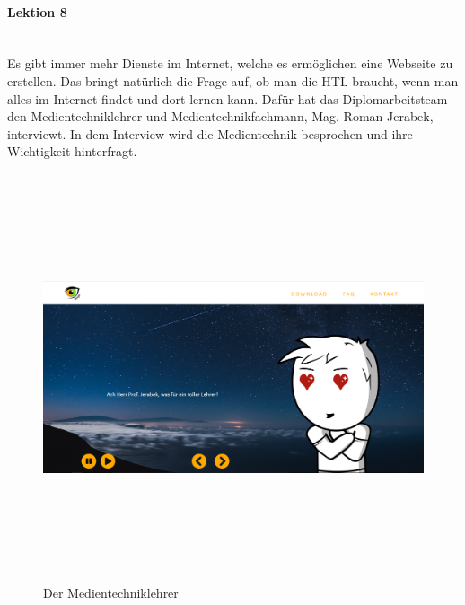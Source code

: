 \paragraph{Lektion 8} \leavevmode \\
Es gibt immer mehr Dienste im Internet, welche es ermöglichen eine Webseite zu erstellen. Das bringt natürlich die Frage auf, ob man die HTL braucht, wenn man alles im Internet findet und dort lernen kann. Dafür hat das Diplomarbeitsteam den Medientechniklehrer und Medientechnikfachmann, Mag. Roman Jerabek, interviewt. In dem Interview wird die Medientechnik besprochen und ihre Wichtigkeit hinterfragt.
\begin{figure}[h]
	\centering
\includegraphics[width=12cm,height=12cm,keepaspectratio]{webseite_abb19} 
	\caption{Der Medientechniklehrer}
\end{figure}
